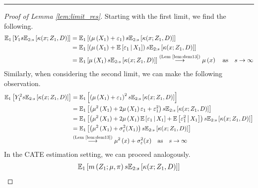 \hrule

\begin{proof}[Proof of Lemma \ref{lem:limit_res}]
	Starting with the first limit, we find the following.
	\begin{equation}
		\begin{aligned}
			\mathbb{E}_{1}\left[Y_1 s \mathbb{E}_{2:s}\left[\kappa(x; Z_1, D)\right]\right]
			& = \mathbb{E}_{1}\left[\left(\mu\left(X_1\right) + \varepsilon_1\right) s \mathbb{E}_{2:s}\left[\kappa(x; Z_1, D)\right]\right]\\
			& = \mathbb{E}_{1}\left[\left(\mu\left(X_1\right) + \mathbb{E}\left[\varepsilon_1 \, \middle| \, X_1\right]\right) s \mathbb{E}_{2:s}\left[\kappa(x; Z_1, D)\right]\right]\\
			& = \mathbb{E}_{1}\left[\mu\left(X_1\right) s \mathbb{E}_{2:s}\left[\kappa(x; Z_1, D)\right]\right]
			\overset{\text{(Lem \ref{lem:dem13})}}{\longrightarrow} \mu\left(x\right)
			\quad \text{as} \quad s \rightarrow \infty
		\end{aligned}
	\end{equation}
	Similarly, when considering the second limit, we can make the following observation.
	\begin{equation}
		\begin{aligned}
			\mathbb{E}_{1}\left[Y_1^2 s \mathbb{E}_{2:s}\left[\kappa(x; Z_1, D)\right]\right]
			& = \mathbb{E}_{1}\left[\left(\mu\left(X_1\right) + \varepsilon_1\right)^2 s \mathbb{E}_{2:s}\left[\kappa(x; Z_1, D)\right]\right]\\
			& = \mathbb{E}_{1}\left[\left(\mu^2\left(X_1\right) + 2\mu\left(X_1\right)\varepsilon_1 + \varepsilon_1^2\right)s \mathbb{E}_{2:s}\left[\kappa(x; Z_1, D)\right]\right]\\
			& = \mathbb{E}_{1}\left[\left(\mu^2\left(X_1\right) + 2\mu\left(X_1\right) \mathbb{E}\left[\varepsilon_1 \, \middle| \, X_1\right] + \mathbb{E}\left[\varepsilon_1^2 \, \middle| \, X_1\right]\right)
			s \mathbb{E}_{2:s}\left[\kappa(x; Z_1, D)\right]\right] \\
			& = \mathbb{E}_{1}\left[\left(\mu^2\left(X_1\right) +\sigma_{\varepsilon}^{2}(X_1)\right) s \mathbb{E}_{2:s}\left[\kappa(x; Z_1, D)\right]\right] \\
			& \overset{\text{(Lem \ref{lem:dem13})}}{\longrightarrow} \mu^2\left(x\right) +\sigma_{\varepsilon}^{2}(x)
			\quad \text{as} \quad s \rightarrow \infty
		\end{aligned}
	\end{equation}
	In the CATE estimation setting, we can proceed analogously.
	\begin{equation}
		\begin{aligned}
			\E_{1}\left[m\left(Z_{1}; \mu, \pi\right) s \E_{2:s}\left[\kappa(x; Z_1, D)\right]\right]

\end{aligned}
\end{equation}
\end{proof}
